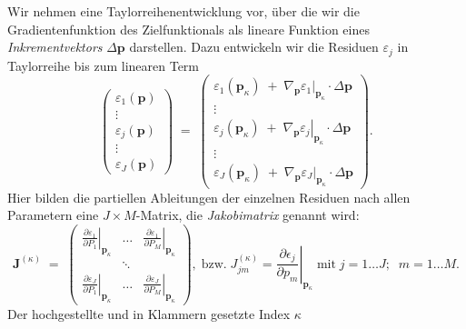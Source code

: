 Wir nehmen eine Taylorreihenentwicklung vor, über die wir die Gradientenfunktion des Zielfunktionals
als lineare Funktion eines \textsl{Inkrementvektors} $\Delta \mathbf{p}$ darstellen. Dazu entwickeln
wir die Residuen $\varepsilon_j$ in Taylorreihe bis zum linearen Term
\begin{equation}
\left(\begin{array}{c}
\varepsilon_1(\mathbf{p}) \\
\vdots \\
\varepsilon_j(\mathbf{p}) \\
\vdots \\
\varepsilon_J(\mathbf{p})
\end{array}\right)
\; = \;
\left(\begin{array}{c}
\varepsilon_1(\mathbf{p}_\kappa) \; + \; \nabla_{\mathbf{p}} \left. \varepsilon_1 \right|_{\mathbf{p}_\kappa} \cdot \Delta \mathbf{p}\\
\vdots \\
\varepsilon_j(\mathbf{p}_\kappa) \; + \; \nabla_{\mathbf{p}} \left. \varepsilon_j \right|_{\mathbf{p}_\kappa} \cdot \Delta \mathbf{p}\\
\vdots \\
\varepsilon_J(\mathbf{p}_\kappa) \; + \; \nabla_{\mathbf{p}} \left. \varepsilon_J \right|_{\mathbf{p}_\kappa} \cdot \Delta \mathbf{p}
\end{array}\right).
\label{TaylorResi1}
\end{equation}
Hier bilden die partiellen Ableitungen der einzelnen Residuen nach allen Parametern eine $J \times M$-Matrix, die \textsl{Jakobimatrix}
genannt wird:
\begin{equation}
\boldsymbol{J}^{(\kappa)} \; = \; \left(\begin{array}{ccc}
\left. \frac{\partial \varepsilon_1}{\partial P_1} \right|_{\mathbf{p}_\kappa} & \dots & \left. \frac{\partial \varepsilon_1}{\partial P_M} \right|_{\mathbf{p}_\kappa} \\
 & \ddots & \\
\left. \frac{\partial \varepsilon_J}{\partial P_1}\right|_{\mathbf{p}_\kappa} & \dots & \left. \frac{\partial \varepsilon_J}{\partial P_M}\right|_{\mathbf{p}_\kappa}
\end{array}\right) ,\; \textrm{bzw.} \; J_{jm}^{(\kappa)}= \left. \frac{\partial \epsilon_j}{\partial p_m}\right|_{\mathbf{p}_\kappa}
\;\textrm{mit} \; j=1\ldots J; \;\; m=1\ldots M.
\label{eq:JakobimatrixDefinition}
\end{equation}
Der hochgestellte und in Klammern gesetzte Index $\kappa$
